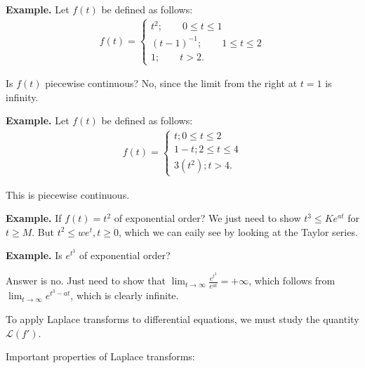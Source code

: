\documentclass{article}
\newcommand{\LL}{\mathcal{L}}
\begin{document}
{\bf Example.} Let $f(t)$ be defined as follows:
\begin{align*}
  f(t) =
  \begin{cases}
    t^2; \qquad 0 \leq t \leq 1 \\
    (t-1)^{-1}; \qquad 1 \leq t \leq 2 \\
    1; \qquad t > 2.
  \end{cases}
\end{align*}


Is $f(t)$ piecewise continuous?  No, since the limit from the right at $t=1$ is infinity.

{\bf Example.} Let $f(t)$ be defined as follows:
\begin{align*}
  f(t) = 
  \begin{cases}
    t; 0 \leq t \leq 2 \\
    1 - t; 2 \leq t \leq 4 \\
    3 (t^2); t > 4.
  \end{cases}
\end{align*}

This is piecewise continuous.

{\bf Example.} If $f(t) = t^2$ of exponential order?  We just need to show $t^3 \leq K e^{at}$ for $t \geq M$.  But $t^2 \leq w e^t, t \geq 0$, which we can eaily see by looking at the Taylor series.

{\bf Example.} Is $e^{t^3}$ of exponential order?

Answer is no.  Just need to show that $\lim_{t \to \infty} \frac{e^{t^3}}{e^{at}} = + \infty$, which follows from $\lim_{t \to \infty} e^{t^3 - at}$, which is clearly infinite.

To apply Laplace transforms to differential equations, we must study the quantity $\LL (f')$.

Important properties of Laplace transforms:
\end{document}
